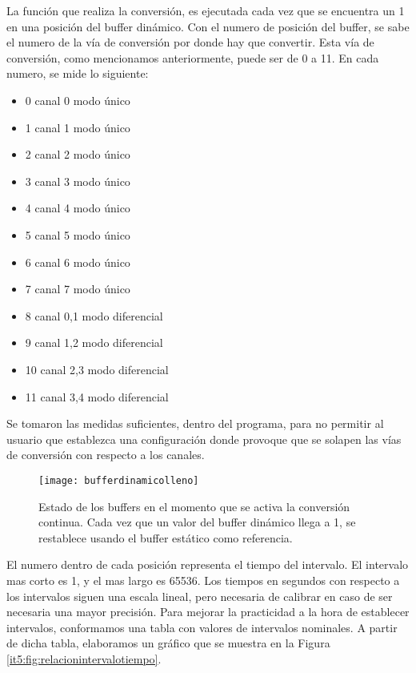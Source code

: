 La función que realiza la conversión, es ejecutada cada vez que se encuentra un 1 en una posición del buffer dinámico. Con el numero de posición del buffer, se sabe el numero de la vía de conversión por donde hay que convertir. Esta vía de conversión, como mencionamos anteriormente, puede ser de 0 a 11. En cada numero, se mide lo siguiente:

\begin{itemize}
\item 0 \textrightarrow  canal 0 modo único
\item 1 \textrightarrow  canal 1 modo único
\item 2 \textrightarrow  canal 2 modo único
\item 3 \textrightarrow  canal 3 modo único
\item 4 \textrightarrow  canal 4 modo único
\item 5 \textrightarrow  canal 5 modo único
\item 6 \textrightarrow  canal 6 modo único
\item 7 \textrightarrow  canal 7 modo único
\item 8 \textrightarrow  canal 0,1 modo diferencial
\item 9 \textrightarrow  canal 1,2 modo diferencial
\item 10 \textrightarrow  canal 2,3 modo diferencial
\item 11 \textrightarrow  canal 3,4 modo diferencial
\end{itemize}

Se tomaron las medidas suficientes, dentro del programa, para no permitir al usuario que establezca una configuración donde provoque que se solapen las vías de conversión con respecto a los canales. 

\begin{figure}[h]
  \centering
  \texttt{[image: bufferdinamicolleno]}
  \caption{Estado de los buffers en el momento que se activa la conversión continua. Cada vez que un valor del buffer dinámico llega a 1, se restablece usando el buffer estático como referencia.}\label{it5:fig:bufferdinamicolleno}
\end{figure}

El numero dentro de cada posición representa el tiempo del intervalo. El intervalo mas corto es 1, y el mas largo es 65536. Los tiempos en segundos con respecto a los intervalos siguen una escala lineal, pero necesaria de calibrar en caso de ser necesaria una mayor precisión. Para mejorar la practicidad a la hora de establecer intervalos, conformamos una tabla con valores de intervalos nominales. A partir de dicha tabla, elaboramos un gráfico que se muestra en la Figura \ref{it5:fig:relacionintervalotiempo}.


